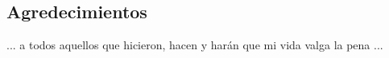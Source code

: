 \sloppy
\newpage
\thispagestyle{empty}

\begin{center}
\section*{Agredecimientos}
... a todos aquellos que hicieron, hacen y har\'an que mi vida valga la pena
...
\end{center}

